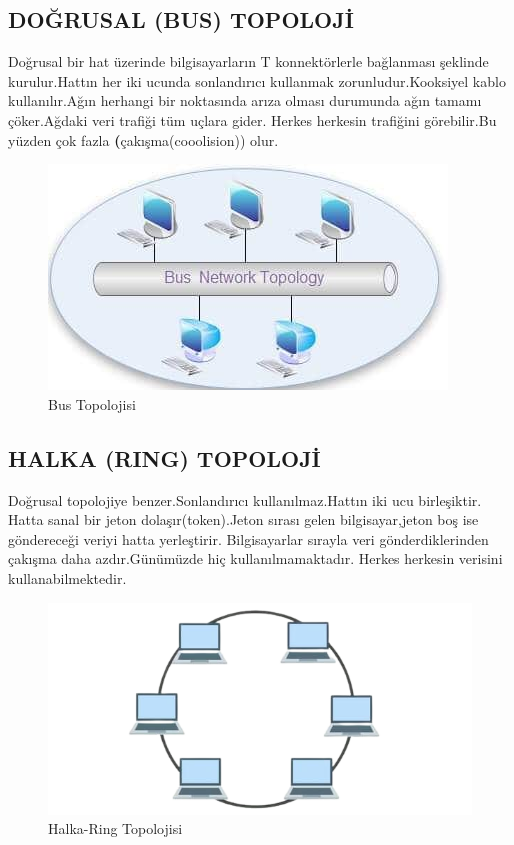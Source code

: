 \subsection*{DOĞRUSAL (BUS) TOPOLOJİ}
Doğrusal bir hat üzerinde bilgisayarların T konnektörlerle bağlanması şeklinde kurulur.Hattın her iki ucunda 
sonlandırıcı kullanmak zorunludur.Kooksiyel kablo kullanılır.Ağın herhangi  bir noktasında arıza olması durumunda ağın tamamı çöker.Ağdaki veri trafiği tüm uçlara gider.
Herkes herkesin trafiğini görebilir.Bu yüzden çok fazla \textbf(çakışma(cooolision)) olur.
\begin{figure}[!ht]
    \includegraphics{images/bus-topolojisi}
   \caption{Bus Topolojisi}
   \label{fig:bustopolojisi}
 \end{figure}

\subsection*{HALKA (RING) TOPOLOJİ}
Doğrusal topolojiye benzer.Sonlandırıcı kullanılmaz.Hattın iki ucu birleşiktir.
Hatta sanal  bir jeton dolaşır(token).Jeton sırası gelen bilgisayar,jeton boş ise göndereceği veriyi hatta yerleştirir.
Bilgisayarlar sırayla  veri gönderdiklerinden çakışma daha azdır.Günümüzde hiç kullanılmamaktadır.
Herkes herkesin verisini kullanabilmektedir.
\begin{figure}[!ht]
    \includegraphics{images/ring-topology-removebg-preview}
    \caption{Halka-Ring Topolojisi}
   \label{fig:halka_topolojisi}
  \end{figure}


